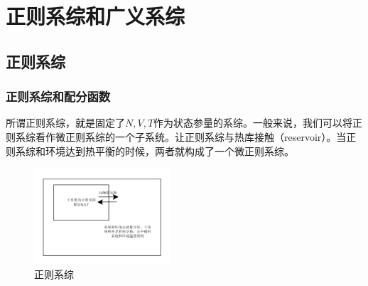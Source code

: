 \chapter{正则系综和广义系综} %
\label{cha:正则系综和广义系综}
\section{正则系综} %
\label{sec:正则系综}
\subsection{正则系综和配分函数} %
\label{sub:正则系综和配分函数}
所谓正则系综，就是固定了$N,V,T$作为状态参量的系综。一般来说，我们可以将正则系综看作微正则系综的一个子系统。让正则系综与热库接触（reservoir）。当正则系综和环境达到热平衡的时候，两者就构成了一个微正则系综。
\begin{figure}[h]
       \centering
       \includegraphics[width=0.45\textwidth]{fig/正则系综.png}
       \caption{正则系综}
\end{figure}

